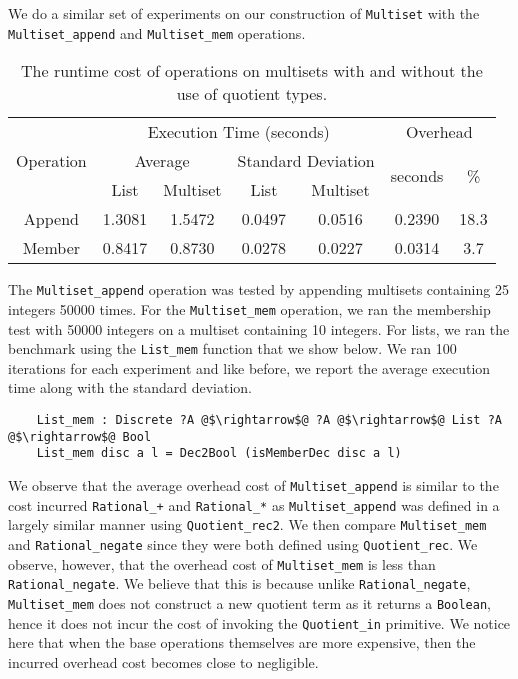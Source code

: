 \documentclass[12pt,twoside,maitrise]{dms}
\theoremstyle{definition}
\numberwithin{equation}{section}
\numberwithin{table}{chapter}
\numberwithin{figure}{chapter}
\newcommand\id[1] {\texttt{#1}}
\begin{document}
We do a similar set of experiments on our construction of \id{Multiset} with the
\id{Multiset\_append} and \id{Multiset\_mem} operations.

\begin{table}[]
\centering
\begin{tabular}{@{}ccccccc@{}}
\toprule
\multirow{3}{*}{Operation} & \multicolumn{4}{c}{Execution Time (seconds)}                         & \multicolumn{2}{c}{Overhead}                   \\ \cmidrule(l){2-7}
                           & \multicolumn{2}{c}{Average} & \multicolumn{2}{c}{Standard Deviation} & \multirow{2}{*}{seconds} & \multirow{2}{*}{\%} \\
       & List   & Multiset & List   & Multiset &        &      \\ \midrule
Append & 1.3081 & 1.5472   & 0.0497 & 0.0516   & 0.2390 & 18.3 \\
Member & 0.8417 & 0.8730   & 0.0278 & 0.0227   & 0.0314 & 3.7  \\ \bottomrule
\end{tabular}
\caption{The runtime cost of operations on multisets with and without the use of quotient types.}\label{tab:benchmark-multiset}
\end{table}

The \id{Multiset\_append} operation was tested by appending multisets containing
25 integers 50000 times. For the \id{Multiset\_mem} operation, we ran the
membership test with 50000 integers on a multiset containing 10 integers. For
lists, we ran the benchmark using the \id{List\_mem} function that we show
below. We ran 100 iterations for each experiment and like before, we report the
average execution time along with the standard deviation.

\begin{verbatim}
    List_mem : Discrete ?A @$\rightarrow$@ ?A @$\rightarrow$@ List ?A @$\rightarrow$@ Bool
    List_mem disc a l = Dec2Bool (isMemberDec disc a l)
\end{verbatim}

We observe that the average overhead cost of \id{Multiset\_append} is similar to
the cost incurred \id{Rational\_+} and \id{Rational\_*} as \id{Multiset\_append}
was defined in a largely similar manner using \id{Quotient\_rec2}. We then
compare \id{Multiset\_mem} and \id{Rational\_negate} since they were both
defined using \id{Quotient\_rec}. We observe, however, that the overhead cost of
\id{Multiset\_mem} is less than \id{Rational\_negate}. We believe that this is
because unlike \id{Rational\_negate}, \id{Multiset\_mem} does not construct a
new quotient term as it returns a \id{Boolean}, hence it does not incur the cost
of invoking the \id{Quotient\_in} primitive. We notice here that when the base
operations themselves are more expensive, then the incurred overhead cost
becomes close to negligible.
\end{document}

